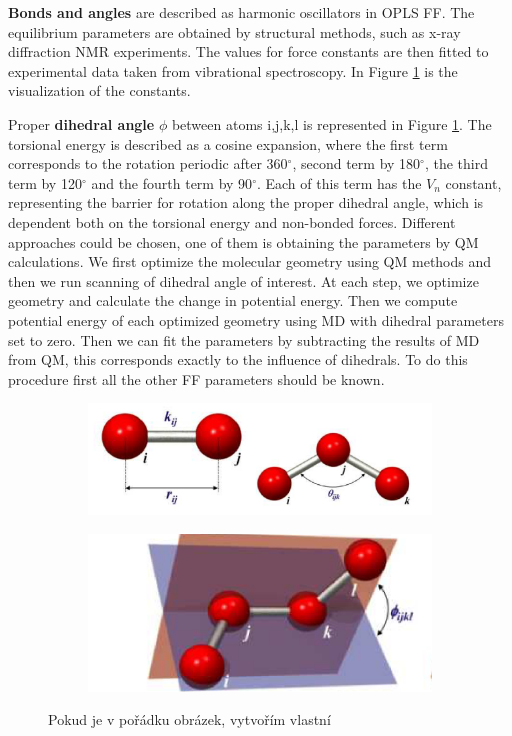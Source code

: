 \textbf{Bonds and angles} are described as harmonic oscillators in OPLS FF. The equilibrium parameters are obtained by structural methods, such as x-ray diffraction NMR experiments. The values for force constants are then fitted to experimental data taken from vibrational spectroscopy. In Figure \ref{fig:torsion} is the visualization of the constants.

Proper \textbf{dihedral angle} $\phi$ between atoms i,j,k,l is represented in Figure \ref{fig:torsion}. The torsional energy is described as a cosine expansion, where the first term corresponds to the rotation periodic after 360$^\circ$, second term by 180$^\circ$, the third term by 120$^\circ$ and the fourth term by 90$^\circ$. Each of this term has the $V_n$ constant, representing the barrier for rotation along the proper dihedral angle, which is dependent both on the torsional energy and non-bonded forces. Different approaches could be chosen, one of them is obtaining the parameters by QM calculations. \cite{mackerell_empirical_2004} We first optimize the molecular geometry using QM methods and then we run scanning of dihedral angle of interest. At each step, we optimize geometry and calculate the change in potential energy.  Then we compute potential energy of each optimized geometry using MD with dihedral parameters set to zero. Then we can fit the parameters by subtracting the results of MD from QM, this corresponds exactly to the influence of dihedrals. To do this procedure first all the other FF parameters should be known. 
\vspace{-0.2cm}
\begin{figure}[H]
\begin{subfigure}{0.5\textwidth}
	\includegraphics[width=0.9\linewidth]{img/bond_angles.png} 
\end{subfigure}
\begin{subfigure}{0.5\textwidth}
	\includegraphics[width=0.7\linewidth]{img/torsion.png}
\end{subfigure} 
\vspace{-0.2cm}
\caption{Pokud je v pořádku obrázek, vytvořím vlastní}
\label{fig:torsion}  
\end{figure}
\vspace{-0.5cm}

